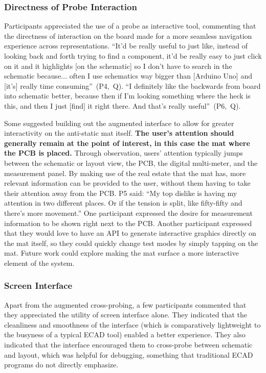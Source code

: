\documentclass [11pt, proquest] {uwthesis}[2020/02/24]
\newcounter{sharc}
\newcommand{\sharcHere}[1]{Q\refstepcounter{sharc}\arabic{sharc}\label{#1}}
\begin{document}
\subsubsection{Directness of Probe Interaction}

Participants appreciated the use of a probe as interactive tool, commenting that the directness of interaction on the board made for a more seamless navigation experience across representations.
``It'd be really useful to just like, instead of looking back and forth trying to find a component, it'd be really easy to just click on it and it highlights [on the schematic] so I don't have to search in the schematic because... often I use schematics way bigger than [Arduino Uno] and [it's] really time consuming''~(P4,~\sharcHere{q:backandforth}).
``I definitely like the backwards from board into schematic better, because then if I'm looking something where the heck is this, and then I just [find] it right there. And that's really useful''~(P6,~\sharcHere{q:wheretheheck}).

Some suggested building out the augmented interface to allow for greater interactivity on the anti-static mat itself.
\textbf{The user’s attention should generally remain at the point of interest, in this case the mat where the PCB is placed.}
Through observation, users’ attention typically jumps between the schematic or layout view, the PCB, the digital multi-meter, and the  measurement panel. By making use of the real estate that the mat has, more relevant information can be provided to the user, without them having to take their attention away from the PCB. P5 said: ``My top dislike is having my attention in two different places. Or if the tension is split, like fifty-fifty and there's more movement.'' One participant expressed the desire for measurement information to be shown right next to the PCB. Another participant expressed that they would love to have an API to generate interactive graphics directly on the mat itself, so they could quickly change test modes by simply tapping on the mat. Future work could explore making the mat surface a more interactive element of the system. 

\subsubsection{Screen Interface}

Apart from the augmented cross-probing, a few participants commented that they appreciated the utility of screen interface alone. They indicated that the cleanliness and smoothness of the interface (which is comparatively lightweight to the busyness of a typical ECAD tool) enabled a better experience. They also indicated that the interface encouraged them to cross-probe between schematic and layout, which was helpful for debugging, something that traditional ECAD programs do not directly emphasize.
\end{document}
